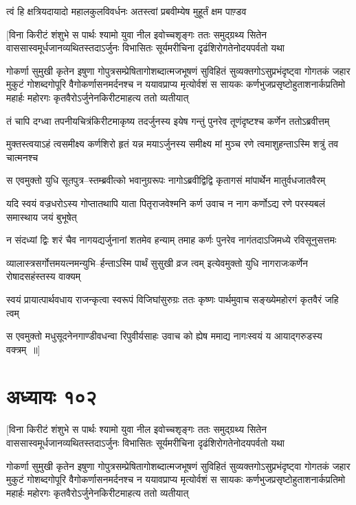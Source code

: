 \twolineshloka
{त्वं हि क्षत्रियदायादो महालकुलविवर्धनः}
{अतस्त्वां प्रबवीम्येष मुहूर्तं क्षम पाण़्डव}


\fourlineindentedshloka
{[विना किरीटं शंशुभे स पार्थः}
{श्यामो युवा नील इवोच्चशृङ्गः}
{ततः समुद्ग्रथ्य सितेन वाससास्वमूर्धजानव्यथितस्तदाऽर्जुनः}
{विभासितः सूर्यमरीचिना दृढंशिरोगतेनोदयपर्वतो यथा}


गोकर्णा सुमुखी कृतेन इषुणा गोपुत्रसम्प्रेषितागोशब्दात्मजभूषणं सुविहितं सुव्यक्तगोऽसुप्रभंदृष्ट्वा गोगतकं जहार मुकुटं गोशब्दगोपूरि वैगोकर्णासनमर्दनश्च न ययावप्राप्य मृत्योर्वशं
\twolineshloka
{स सायकः कर्णभुजप्रसृष्टोहुताशनार्कप्रतिमो महार्हः}
{महोरगः कृतवैरोऽर्जुनेनकिरीटमाहत्य ततो व्यतीयात्}


\twolineshloka
{तं चापि दग्ध्वा तपनीयचित्रंकिरीटमाकृष्य तदर्जुनस्य}
{इयेष गन्तुं पुनरेव तूणंदृष्टश्च कर्णेन ततोऽब्रवीत्तम्}


\twolineshloka
{मुक्तस्त्वयाऽहं त्वसमीक्ष्य कर्णशिरो हृतं यन्न मयाऽर्जुनस्य}
{समीक्ष्य मां मुञ्च रणे त्वमाशुहन्ताऽस्मि शत्रुं तव चात्मनश्च}


\twolineshloka
{स एवमुक्तो युधि सूतपुत्र--स्तम्ब्रवीत्को भवानुग्ररूपः}
{नागोऽब्रवीद्विद्वि कृतागसं मांपार्थेन मातुर्वधजातवैरम्}


\threelineshloka
{यदि स्वयं वज्रधरोऽस्य गोप्तातथापि याता पितृराजवेश्मनि}
{कर्ण उवाच}
{न नाग कर्णोऽद्य रणे परस्यबलं समास्थाय जयं बुभूषेत्}


\twolineshloka
{न संदध्यां द्विः शरं चैव नागयद्यर्जुनानां शतमेव हन्याम्}
{तमाह कर्णः पुनरेव नागंतदाऽजिमध्ये रविसूनुसत्तमः}


\twolineshloka
{व्यालास्त्रसर्गोत्तमयत्नमन्युभि--र्हन्ताऽस्मि पार्थं सुसुखी व्रज त्वम्}
{इत्येवमुक्तो युधि नागराजःकर्णेन रोषादसहंस्तस्य वाक्यम्}


\twolineshloka
{स्वयं प्रायात्पार्थवधाय राजन्कृत्वा स्वरूपं विजिघांसुरुग्रः}
{ततः कृष्णः पार्थमुवाच सङ्ख्येमहोरगं कृतवैरं जहि त्वम्}


\twolineshloka
{स एवमुक्तो मधुसूदनेनगाण्डीवधन्वा रिपुवीर्यसाहः}
{उवाच को ह्येष ममाद्य नागःस्वयं य आयाद्गरुडस्य वक्त्रम् ॥]}


\chapter{अध्यायः १०२}
\fourlineindentedshloka
{[विना किरीटं शंशुभे स पार्थः}
{श्यामो युवा नील इवोच्चशृङ्गः}
{ततः समुद्ग्रथ्य सितेन वाससास्वमूर्धजानव्यथितस्तदाऽर्जुनः}
{विभासितः सूर्यमरीचिना दृढंशिरोगतेनोदयपर्वतो यथा}


गोकर्णा सुमुखी कृतेन इषुणा गोपुत्रसम्प्रेषितागोशब्दात्मजभूषणं सुविहितं सुव्यक्तगोऽसुप्रभंदृष्ट्वा गोगतकं जहार मुकुटं गोशब्दगोपूरि वैगोकर्णासनमर्दनश्च न ययावप्राप्य मृत्योर्वशं
\twolineshloka
{स सायकः कर्णभुजप्रसृष्टोहुताशनार्कप्रतिमो महार्हः}
{महोरगः कृतवैरोऽर्जुनेनकिरीटमाहत्य ततो व्यतीयात्}


